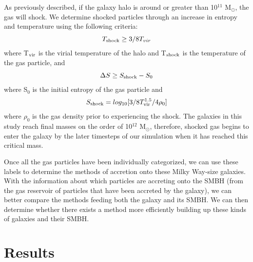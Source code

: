 \documentclass[manuscript]{aastex}
\begin{document}
As previously described, if the galaxy halo is around or greater than 10$^{11}$ M$_{\odot} $, the gas will shock. We determine shocked particles through an increase in entropy and temperature using the following criteria:
\begin{equation}
T_{\rm shock} \geq 3/8 T_{vir}
\end{equation}
where T$_{\rm vir}$ is the virial temperature of the halo and T$_{\rm shock}$ is the temperature of the gas particle, and 
\begin{equation}
\Delta S \geq S_{\rm shock} - S_0
\end{equation}
where S$_0$ is the initial entropy of the gas particle and 
\begin{equation}
S_{\rm shock} = log_{10}[3/8 T_{\rm vir}^{1.5}/4 \rho_0]
\end{equation}
where $\rho_0$ is the gas density prior to experiencing the shock. The galaxies in this study reach final masses on the order of 10$^{12}$ M$_{\odot} $, therefore, shocked gas begins to enter the galaxy by the later timesteps of our simulation when it has reached this critical mass. 


Once all the gas particles have been individually categorized, we can use these labels to determine the methods of accretion onto these Milky Way-size galaxies. With the information about which particles are accreting onto the SMBH (from the gas reservoir of particles that have been accreted by the galaxy), we can better compare the methods feeding both the galaxy and its SMBH. We can then determine whether there exists a method more efficiently building up these kinds of galaxies and their SMBH.

\section{Results} \label{results}
\end{document}
